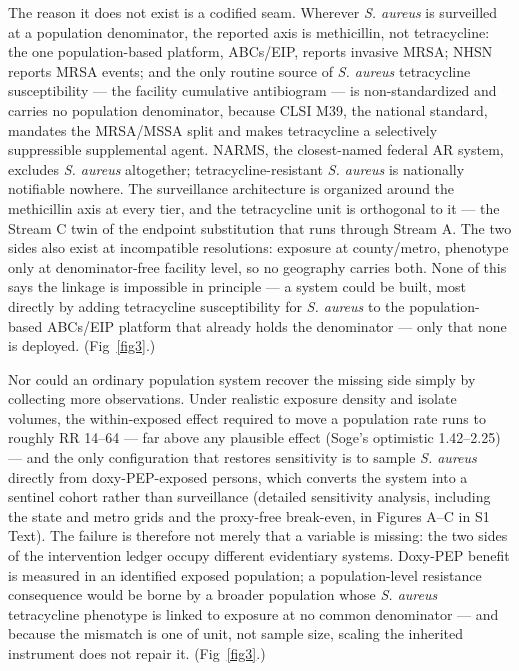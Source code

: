 \documentclass[10pt,letterpaper]{article}
\begin{document}
The reason it does not exist is a codified seam. Wherever \emph{S.
aureus} is surveilled at a population denominator, the reported axis is
methicillin, not tetracycline: the one population-based platform,
ABCs/EIP, reports invasive MRSA; NHSN reports MRSA events; and
the only routine source of \emph{S. aureus} tetracycline susceptibility
--- the facility cumulative antibiogram --- is non-standardized and
carries no population denominator, because CLSI M39, the national
standard, mandates the MRSA/MSSA split and makes tetracycline a
selectively suppressible supplemental agent. NARMS, the closest-named
federal AR system, excludes \emph{S. aureus} altogether;
tetracycline-resistant \emph{S. aureus} is nationally notifiable
nowhere. The surveillance architecture is organized around the
methicillin axis at every tier, and the tetracycline unit is orthogonal
to it --- the Stream C twin of the endpoint substitution that runs
through Stream A. The two sides also exist at incompatible resolutions:
exposure at county/metro, phenotype only at denominator-free facility
level, so no geography carries both. None of this says the linkage is
impossible in principle --- a system could be built, most directly by
adding tetracycline susceptibility for \emph{S. aureus} to the
population-based ABCs/EIP platform that already holds the denominator
--- only that none is deployed. (Fig~\ref{fig3}.)

Nor could an ordinary population system recover the missing side simply
by collecting more observations. Under realistic exposure density and
isolate volumes, the within-exposed effect required to move a population
rate runs to roughly RR 14--64 --- far above any plausible
effect (Soge's optimistic 1.42--2.25) --- and the only configuration
that restores sensitivity is to sample \emph{S. aureus} directly from
doxy-PEP-exposed persons, which converts the system into a sentinel
cohort rather than surveillance (detailed sensitivity analysis,
including the state and metro grids and the proxy-free break-even, in
Figures A--C in S1 Text). The failure is
therefore not merely that a variable is missing: the two sides of the
intervention ledger occupy different evidentiary systems. Doxy-PEP
benefit is measured in an identified exposed population; a
population-level resistance consequence would be borne by a broader
population whose \emph{S. aureus} tetracycline phenotype is linked to
exposure at no common denominator --- and because the mismatch is one of
unit, not sample size, scaling the inherited instrument does not
repair it. (Fig~\ref{fig3}.)
\end{document}
